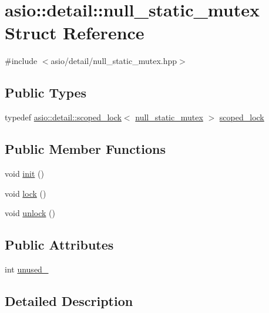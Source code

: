 \hypertarget{structasio_1_1detail_1_1null__static__mutex}{}\section{asio\+:\+:detail\+:\+:null\+\_\+static\+\_\+mutex Struct Reference}
\label{structasio_1_1detail_1_1null__static__mutex}


{\ttfamily \#include $<$asio/detail/null\+\_\+static\+\_\+mutex.\+hpp$>$}

\subsection*{Public Types}
\begin{DoxyCompactItemize}
\item 
typedef \hyperlink{classasio_1_1detail_1_1scoped__lock}{asio\+::detail\+::scoped\+\_\+lock}$<$ \hyperlink{structasio_1_1detail_1_1null__static__mutex}{null\+\_\+static\+\_\+mutex} $>$ \hyperlink{structasio_1_1detail_1_1null__static__mutex_aba457250895d151e2d873fbda1a4a5a3}{scoped\+\_\+lock}
\end{DoxyCompactItemize}
\subsection*{Public Member Functions}
\begin{DoxyCompactItemize}
\item 
void \hyperlink{structasio_1_1detail_1_1null__static__mutex_a86f815756bd9ec7f51454dcfbd1a7a1b}{init} ()
\item 
void \hyperlink{structasio_1_1detail_1_1null__static__mutex_a2d6fcff41249adac226fe66037641470}{lock} ()
\item 
void \hyperlink{structasio_1_1detail_1_1null__static__mutex_ac0bf70b02fd736037b4f51ffb1a11a98}{unlock} ()
\end{DoxyCompactItemize}
\subsection*{Public Attributes}
\begin{DoxyCompactItemize}
\item 
int \hyperlink{structasio_1_1detail_1_1null__static__mutex_a0cfc4860ac23ca375273e89b27c94f05}{unused\+\_\+}
\end{DoxyCompactItemize}


\subsection{Detailed Description}


